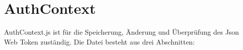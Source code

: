 \section{AuthContext}
AuthContext.js ist für die Speicherung, Änderung und Überprüfung des Json Web Token zuständig. Die
Datei besteht aus drei Abschnitten:


\newpage


\newpage




